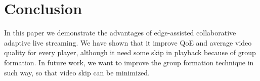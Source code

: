 \section{Conclusion}
In this paper we demonstrate the advantages of edge-assisted collaborative adaptive live streaming. We have shown that it improve QoE and average video quality for every player, although it need some skip in playback because of group formation. In future work, we want to improve the group formation technique in such way, so that video skip can be minimized.